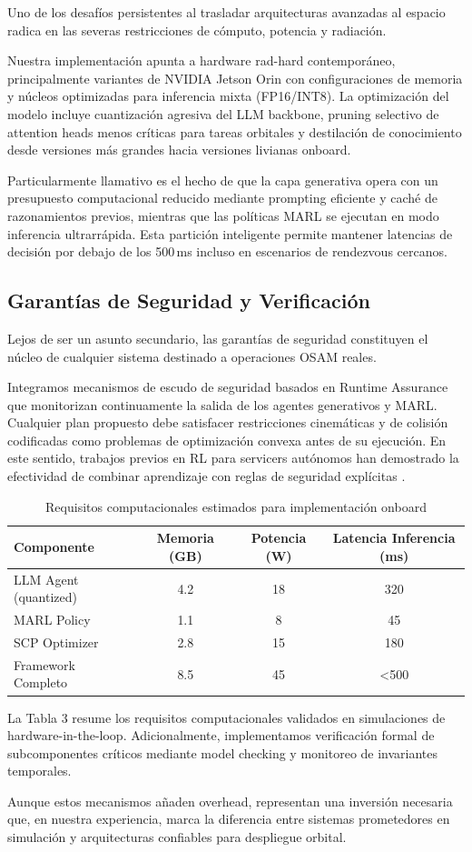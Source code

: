 Uno de los desafíos persistentes al trasladar arquitecturas avanzadas al espacio radica en las severas restricciones de cómputo, potencia y radiación. 

Nuestra implementación apunta a hardware rad-hard contemporáneo, principalmente variantes de NVIDIA Jetson Orin con configuraciones de memoria y núcleos optimizadas para inferencia mixta (FP16/INT8). La optimización del modelo incluye cuantización agresiva del LLM backbone, pruning selectivo de attention heads menos críticas para tareas orbitales y destilación de conocimiento desde versiones más grandes hacia versiones livianas onboard.

Particularmente llamativo es el hecho de que la capa generativa opera con un presupuesto computacional reducido mediante prompting eficiente y caché de razonamientos previos, mientras que las políticas MARL se ejecutan en modo inferencia ultrarrápida. Esta partición inteligente permite mantener latencias de decisión por debajo de los 500\,ms incluso en escenarios de rendezvous cercanos.

\subsection{Garantías de Seguridad y Verificación}

Lejos de ser un asunto secundario, las garantías de seguridad constituyen el núcleo de cualquier sistema destinado a operaciones OSAM reales. 

Integramos mecanismos de escudo de seguridad basados en Runtime Assurance que monitorizan continuamente la salida de los agentes generativos y MARL. Cualquier plan propuesto debe satisfacer restricciones cinemáticas y de colisión codificadas como problemas de optimización convexa antes de su ejecución. En este sentido, trabajos previos en RL para servicers autónomos han demostrado la efectividad de combinar aprendizaje con reglas de seguridad explícitas \cite{Patnala2024_OOS_RL}.

\begin{table}[t]
\centering
\caption{Requisitos computacionales estimados para implementación onboard}
\label{tab:compute_requirements}
\begin{tabular}{lccc}
\hline
Componente & Memoria (GB) & Potencia (W) & Latencia Inferencia (ms) \\
\hline
LLM Agent (quantized) & 4.2 & 18 & 320 \\
MARL Policy & 1.1 & 8 & 45 \\
SCP Optimizer & 2.8 & 15 & 180 \\
Framework Completo & 8.5 & 45 & <500 \\
\hline
\end{tabular}
\end{table}

La Tabla 3 resume los requisitos computacionales validados en simulaciones de hardware-in-the-loop. Adicionalmente, implementamos verificación formal de subcomponentes críticos mediante model checking y monitoreo de invariantes temporales. 

Aunque estos mecanismos añaden overhead, representan una inversión necesaria que, en nuestra experiencia, marca la diferencia entre sistemas prometedores en simulación y arquitecturas confiables para despliegue orbital.
